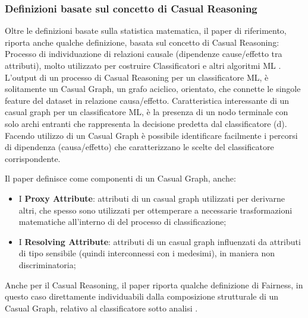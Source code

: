  \subsubsection{Definizioni basate sul concetto di Casual Reasoning}
 Oltre le definizioni basate sulla statistica matematica, il paper di riferimento, riporta anche qualche definizione, basata sul concetto di Casual Reasoning: Processo di individuazione di relazioni causale (dipendenze cause/effetto tra attributi), molto utilizzato  per costruire Classificatori e altri algoritmi ML  \cite{FairnessDefinitionExplained}.   
 \\L'output di un processo di Casual Reasoning per un classificatore ML, è solitamente un Casual Graph, un grafo aciclico, orientato, che connette le singole feature del dataset in relazione causa/effetto. Caratteristica interessante di un casual graph per un classificatore ML, è la presenza di un nodo terminale con solo archi entranti che rappresenta la decisione predetta dal classificatore (d). Facendo utilizzo di un Casual Graph è possibile identificare facilmente i percorsi di dipendenza (causa/effetto) che caratterizzano le scelte del classificatore corrispondente.
 
 Il paper \cite{FairnessDefinitionExplained} definisce come componenti di un Casual Graph, anche:
 \begin{itemize}
     \item I \textbf{Proxy Attribute}: attributi di un casual graph utilizzati per derivarne altri, che spesso sono utilizzati per ottemperare a necessarie trasformazioni matematiche all'interno di del processo di classificazione;
     \item I \textbf{Resolving Attribute}: attributi di un casual graph influenzati da  attributi di tipo sensibile (quindi interconnessi con i medesimi), in maniera non discriminatoria;
 \end{itemize}
 
 Anche per il Casual Reasoning, il paper riporta qualche definizione di Fairness, in questo caso direttamente individuabili dalla composizione strutturale di un Casual Graph, relativo al classificatore sotto analisi \cite{FairnessDefinitionExplained}.
 
